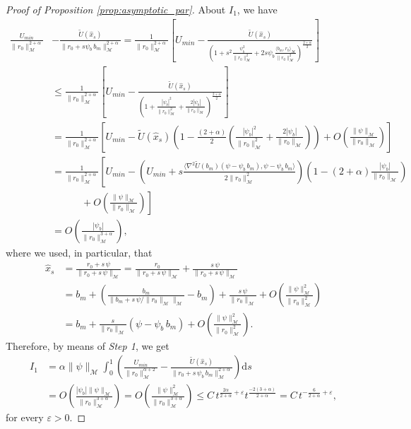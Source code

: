 \documentclass[10pt,a4paper]{amsart}
\newcommand{\ud}{\mathrm{d}}
\begin{document}
\begin{proof}[Proof of Proposition \ref{prop:asymptotic_par}]
About $I_1$,  we have
{
\[
\begin{aligned}
 \frac{U_{min}}{\|r_0\|_\mathcal{M}^{2+\alpha}}&-\frac{\tilde U(\hat x_s)}{\|r_0+s\psi_b\,b_m\|_\mathcal{M}^{2+\alpha}}
=
\frac{1}{\|r_0\|_\mathcal{M}^{2+\alpha}}
\left[
U_{min}
-
\frac{\tilde U(\hat x_s)}{
\left( 1 + s^2\frac{\psi_b^2}{\|r_0\|_\mathcal{M}^2} + 2s\psi_b \frac{\langle b_m,r_0\rangle_\mathcal{M}}{\|r_0\|_\mathcal{M}^2} \right)^{\frac{2+\alpha}{2}}}
\right]
\\[0.6em]
& \le \frac{1}{\|r_0\|_\mathcal{M}^{2+\alpha}}
\left[
U_{min}
-
\frac{\tilde U(\hat x_s)}{
\left( 1 + \frac{|\psi_b|^2}{\|r_0\|_\mathcal{M}^2} +  \frac{ 2|\psi_b|}{\|r_0\|_\mathcal{M}} \right)^{\frac{2+\alpha}{2}}}
\right]
\\[0.6em]
&=\frac{1}{\|r_0\|_\mathcal{M}^{2+\alpha}}\left[U_{min} - \tilde U(\hat x_s) \left(1 - \frac{(2+\alpha)}{2}\left(\frac{|\psi_b|^2}{\|r_0\|_\mathcal{M}^2} + \frac{2|\psi_b|}{\|r_0\|_\mathcal{M}}\right)\right)+O\left(\frac{\|\psi\|_\mathcal{M}}{\|r_0\|_\mathcal{M}}\right)\right]
\\
&=\frac{1}{\|r_0\|_\mathcal{M}^{2+\alpha}}\left[U_{min}-\left(U_{min}+s\frac{\langle \nabla^2\tilde U(b_m)(\psi-\psi_b\,b_m),\psi- \psi_b\,b_m\rangle}{2\|r_0\|_\mathcal{M}^2}\right)\left(1-(2+\alpha)\frac{|\psi_b|}{\|r_0\|_{\mathcal M}}\right)\right.
\\
&\quad \quad \quad +\left.O\left(\frac{\|\psi\|_\mathcal{M}}{\|r_0\|_\mathcal{M}}\right)\right]
\\
&=O\left(\frac{|\psi_b|}{\|r_0\|_{\mathcal M}^{3+\alpha}}\right),
\end{aligned}
\]
where we used, in particular, that
\begin{equation}\label{eq:x_hat}
\begin{aligned}
    \hat x_s &= \frac{r_0+s\,\psi}{\|r_0+s\,\psi\|_\mathcal{M}} = \frac{r_0}{\|r_0+s\,\psi\|_\mathcal{M}}+\frac{s\,\psi}{\|r_0+s\,\psi\|_\mathcal{M}}
    \\
    &=b_m+\left(\frac{b_m}{\|b_m+s\,\psi/\|r_0\|_\mathcal{M}\|_\mathcal{M}}-b_m\right) + \frac{s\,\psi}{\|r_0\|_\mathcal{M}} + O\left(\frac{\|\psi\|_\mathcal{M}^2}{\|r_0\|_\mathcal{M}^2}\right)
    \\
    &= b_m + \frac{s}{\|r_0\|_\mathcal{M}}\left(\psi-\psi_b\,b_m\right)+ O\left(\frac{\|\psi\|_\mathcal{M}^2}{\|r_0\|_\mathcal{M}^2}\right).
    \end{aligned}
\end{equation}
}
Therefore, by means of {\em Step 1}, we get
\[
\begin{aligned}
I_1&=\alpha\|\psi\|_\mathcal{M}\int_0^1\left(
\frac{U_{min}}{\|r_0\|_\mathcal{M}^{\alpha+2}}
-
\frac{\tilde U(\hat x_s)}{\|r_0+s\,\psi_b\,b_m\|_\mathcal{M}^{2+\alpha}}\right)\ud s
\\
& =
O\!\left(
\frac{|\psi_b|\|\psi\|_\mathcal{M}}{\|r_0\|_\mathcal{M}^{3+\alpha}}
\right) = O\!\left(
\frac{\|\psi\|_\mathcal{M}^2}{\|r_0\|_\mathcal{M}^{3+\alpha}}
\right) \le C\, t^{\frac{2\alpha}{2+\alpha}+\varepsilon}t^\frac{-2(3+\alpha)}{2+\alpha}= C\,t^{-\frac{6}{2+\alpha}+\varepsilon},
\end{aligned}
\]
for every $\varepsilon>0$.


\end{proof}
\end{document}
